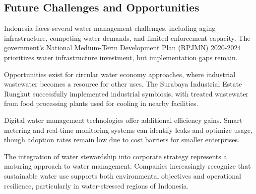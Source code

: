 \subsection{Future Challenges and Opportunities}

Indonesia faces several water management challenges, including aging infrastructure, competing water demands, and limited enforcement capacity. The government's National Medium-Term Development Plan (RPJMN) 2020-2024 prioritizes water infrastructure investment, but implementation gaps remain.

Opportunities exist for circular water economy approaches, where industrial wastewater becomes a resource for other uses. The Surabaya Industrial Estate Rungkut successfully implemented industrial symbiosis, with treated wastewater from food processing plants used for cooling in nearby facilities.

Digital water management technologies offer additional efficiency gains. Smart metering and real-time monitoring systems can identify leaks and optimize usage, though adoption rates remain low due to cost barriers for smaller enterprises.

The integration of water stewardship into corporate strategy represents a maturing approach to water management. Companies increasingly recognize that sustainable water use supports both environmental objectives and operational resilience, particularly in water-stressed regions of Indonesia.